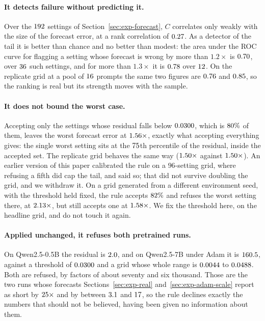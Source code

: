 \paragraph{It detects failure without predicting it.} Over the $192$ settings of
Section~\ref{sec:exp-forecast}, $C$ correlates only weakly with the size of the forecast error, at
a rank correlation of $0.27$. As a detector of the tail it is better than chance and no
better than modest: the area under the ROC curve for flagging a setting whose forecast is wrong
by more than $1.2\times$ is $0.70$, over $36$ such settings, and for
more than $1.3\times$ it is $0.78$ over $12$. On the replicate grid at
a pool of $16$ prompts the same two figures are $0.76$
and $0.85$, so the ranking is real but its strength moves with the sample.

\paragraph{It does not bound the worst case.} Accepting only the settings whose residual falls
below $0.0300$, which is $80\%$ of them, leaves the worst forecast error
at $1.56\times$, exactly what accepting everything gives: the single worst setting
sits at the $75$th percentile of the residual, inside the accepted set. The
replicate grid behaves the same way ($1.50\times$ against
$1.50\times$). An earlier version of this paper calibrated the rule on a
$96$-setting grid, where refusing a fifth did cap the tail, and said so; that did not survive
doubling the grid, and we withdraw it. On a grid generated from a different environment seed,
with the threshold held fixed, the rule accepts $82\%$ and refuses the worst
setting there, at $2.13\times$, but still accepts one at
$1.58\times$. We fix the threshold here, on the headline grid, and do not
touch it again.

\paragraph{Applied unchanged, it refuses both pretrained runs.} On Qwen2.5-0.5B the residual is
$2.0$, and on Qwen2.5-7B under Adam it is $160.5$, against a threshold of
$0.0300$ and a grid whose whole range is $0.0044$ to $0.0488$. Both are
refused, by factors of about seventy and six thousand. Those are the two runs whose forecasts
Sections~\ref{sec:exp-real} and~\ref{sec:exp-adam-scale} report as short by $25\times$ and by
between $3.1$ and $17$, so the rule declines exactly
the numbers that should not be believed, having been given no information about them.

